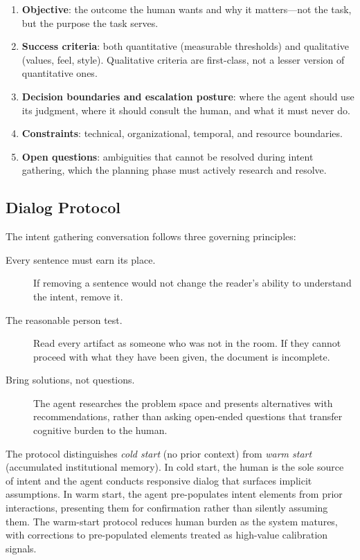 \documentclass[11pt,a4paper]{article}
\begin{document}
\begin{enumerate}
    \item \textbf{Objective}: the outcome the human wants and why it
    matters---not the task, but the purpose the task serves.
    \item \textbf{Success criteria}: both quantitative (measurable
    thresholds) and qualitative (values, feel, style). Qualitative
    criteria are first-class, not a lesser version of quantitative ones.
    \item \textbf{Decision boundaries and escalation posture}: where
    the agent should use its judgment, where it should consult the
    human, and what it must never do.
    \item \textbf{Constraints}: technical, organizational, temporal,
    and resource boundaries.
    \item \textbf{Open questions}: ambiguities that cannot be resolved
    during intent gathering, which the planning phase must actively
    research and resolve.
\end{enumerate}

\subsection{Dialog Protocol}

The intent gathering conversation follows three governing principles:

\begin{description}
    \item[Every sentence must earn its place.] If removing a sentence
    would not change the reader's ability to understand the intent,
    remove it.
    \item[The reasonable person test.] Read every artifact as someone
    who was not in the room. If they cannot proceed with what they
    have been given, the document is incomplete.
    \item[Bring solutions, not questions.] The agent researches the
    problem space and presents alternatives with recommendations,
    rather than asking open-ended questions that transfer cognitive
    burden to the human.
\end{description}

The protocol distinguishes \emph{cold start} (no prior context) from
\emph{warm start} (accumulated institutional memory). In cold start,
the human is the sole source of intent and the agent conducts responsive
dialog that surfaces implicit assumptions. In warm start, the agent
pre-populates intent elements from prior interactions, presenting them
for confirmation rather than silently assuming them. The warm-start
protocol reduces human burden as the system matures, with corrections
to pre-populated elements treated as high-value calibration signals.
\end{document}
